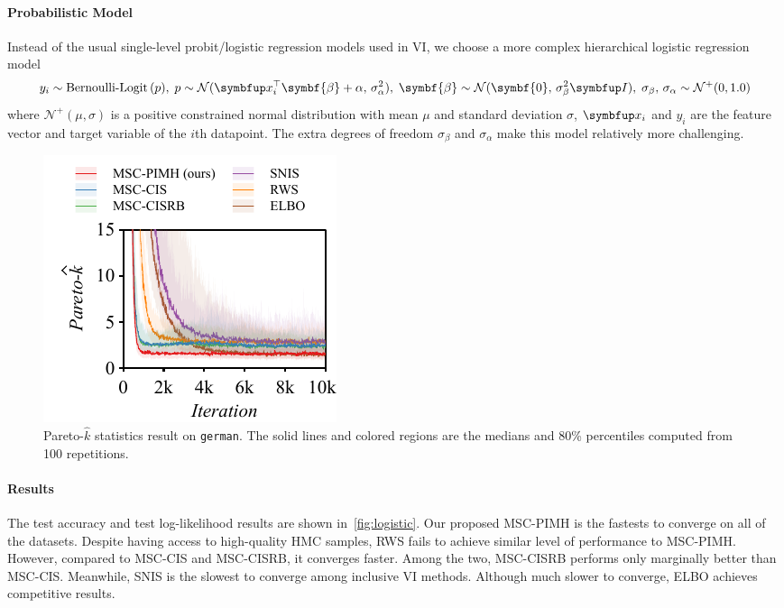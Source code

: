 \vspace{-0.1in}
\paragraph{Probabilistic Model}
Instead of the usual single-level probit/logistic regression models used in VI, we choose a more complex hierarchical logistic regression model 
%
\begin{equation}
y_i \sim \text{Bernoulli-Logit}\,(p),\;
p \sim \mathcal{N}(\vx_i^{\top}\symbf{\beta} + \alpha,\, \sigma_{\alpha}^2),\;
\symbf{\beta} \sim \mathcal{N}(\symbf{0},\, \sigma_{\beta}^2 \mI),\;
\sigma_{\beta},\,\sigma_{\alpha} \sim \mathcal{N}^{+}(0, 1.0)
\end{equation}
%
where \(\mathcal{N}^+(\mu, \sigma)\) is a positive constrained normal distribution with mean \(\mu\) and standard deviation \(\sigma\), \(\vx_i\) and \(y_i\) are the feature vector and target variable of the \(i\)th datapoint.
The extra degrees of freedom \(\sigma_{\beta}\) and \(\sigma_{\alpha}\) make this model relatively more challenging.

%
\begin{figure}
  \vspace{-0.3in}
  \includegraphics[scale=0.75]{figures/german_01.pdf}
  \caption{Pareto-\(\widehat{k}\) statistics result on \texttt{german}.
    The solid lines and colored regions are the medians and 80\% percentiles computed from 100 repetitions.
    }\label{fig:paretok}
  \vspace{-0.2in}
\end{figure}
%
\vspace{-0.1in}
\paragraph{Results}
The test accuracy and test log-likelihood results are shown in~\cref{fig:logistic}.
Our proposed MSC-PIMH is the fastests to converge on all of the datasets.
Despite having access to high-quality HMC samples, RWS fails to achieve similar level of performance to MSC-PIMH.
However, compared to MSC-CIS and MSC-CISRB, it converges faster.
Among the two, MSC-CISRB performs only marginally better than MSC-CIS.
Meanwhile, SNIS is the slowest to converge among inclusive VI methods.
Although much slower to converge, ELBO achieves competitive results.

